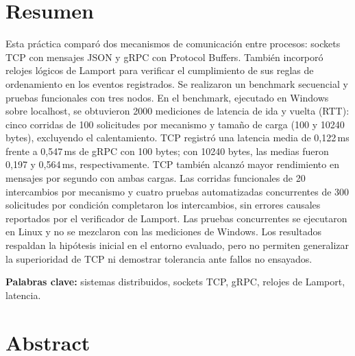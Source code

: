 \section*{Resumen}

Esta práctica comparó dos mecanismos de comunicación entre procesos: sockets TCP con mensajes JSON y gRPC con Protocol Buffers. También incorporó relojes lógicos de Lamport para verificar el cumplimiento de sus reglas de ordenamiento en los eventos registrados. Se realizaron un benchmark secuencial y pruebas funcionales con tres nodos. En el benchmark, ejecutado en Windows sobre localhost, se obtuvieron 2000 mediciones de latencia de ida y vuelta (RTT): cinco corridas de 100 solicitudes por mecanismo y tamaño de carga (100 y 10240 bytes), excluyendo el calentamiento. TCP registró una latencia media de 0,122\,ms frente a 0,547\,ms de gRPC con 100 bytes; con 10240 bytes, las medias fueron 0,197 y 0,564\,ms, respectivamente. TCP también alcanzó mayor rendimiento en mensajes por segundo con ambas cargas. Las corridas funcionales de 20 intercambios por mecanismo y cuatro pruebas automatizadas concurrentes de 300 solicitudes por condición completaron los intercambios, sin errores causales reportados por el verificador de Lamport. Las pruebas concurrentes se ejecutaron en Linux y no se mezclaron con las mediciones de Windows. Los resultados respaldan la hipótesis inicial en el entorno evaluado, pero no permiten generalizar la superioridad de TCP ni demostrar tolerancia ante fallos no ensayados.

\par\smallskip
\noindent\textbf{Palabras clave:}
sistemas distribuidos, sockets TCP, gRPC,
relojes de Lamport, latencia.

\vspace{0.6cm}

\section*{Abstract}

